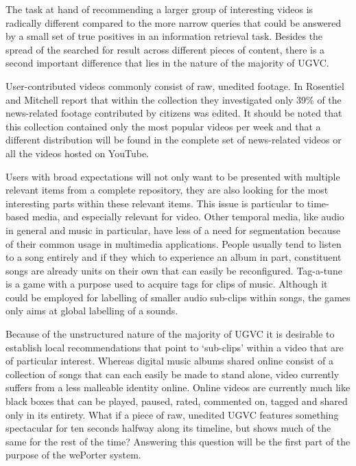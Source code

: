 The task at hand of recommending a larger group of interesting videos is radically different compared to the more narrow queries that could be answered by a small set of true positives in an information retrieval task. Besides the spread of the searched for result across different pieces of content, there is a second important difference that lies in the nature of the majority of UGVC.

User-contributed videos commonly consist of raw, unedited footage. In \cite{Rosenstiel:2012vb} Rosentiel and Mitchell report that within the collection they investigated only 39\% of the news-related footage contributed by citizens was edited. It should be noted that this collection contained only the most popular videos per week and that a different distribution will be found in the complete set of news-related videos or all the videos hosted on YouTube. 

Users with broad expectations will not only want to be presented with multiple relevant items from a complete repository, they are also looking for the most interesting parts within these relevant items. This issue is particular to time-based media, and especially relevant for video. Other temporal media, like audio in general and music in particular, have less of a need for segmentation because of  their common usage in multimedia applications. People usually tend to listen to a song entirely and if they which to experience an album in part, constituent songs are already units on their own that can easily be reconfigured. Tag-a-tune is a game with a purpose used to acquire tags for clips of music. Although it could be employed for labelling of smaller audio sub-clips within songs, the games only aims at global labelling of a sounds\cite{Law:2009vl}.

Because of the unstructured nature of the majority of UGVC it is desirable to establish local recommendations that point to `sub-clips' within a video that are of particular interest. Whereas digital music albums shared online consist of a collection of songs that can each easily be made to stand alone, video currently suffers from a less malleable identity online.  Online videos are currently much like black boxes that can be played, paused, rated, commented on, tagged and shared only in its entirety. What if a piece of raw, unedited UGVC features something spectacular for ten seconds halfway along its timeline, but shows much of the same for the rest of the time? Answering this question will be the first part of the purpose of the wePorter system.

